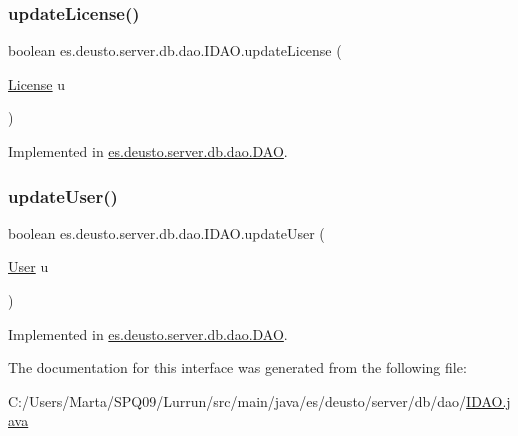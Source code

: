 \subsubsection{\texorpdfstring{update\+License()}{updateLicense()}}
{\footnotesize\ttfamily boolean es.\+deusto.\+server.\+db.\+dao.\+I\+D\+A\+O.\+update\+License (\begin{DoxyParamCaption}\item[{\hyperlink{classes_1_1deusto_1_1server_1_1db_1_1data_1_1_license}{License}}]{u }\end{DoxyParamCaption})}



Implemented in \hyperlink{classes_1_1deusto_1_1server_1_1db_1_1dao_1_1_d_a_o_a98774e8d93cdd4d8d104a197bd37d4e1}{es.\+deusto.\+server.\+db.\+dao.\+D\+AO}.

\mbox{\label{interfacees_1_1deusto_1_1server_1_1db_1_1dao_1_1_i_d_a_o_a790b00e2989b634c1bbb2c6620ff3583}} 
\subsubsection{\texorpdfstring{update\+User()}{updateUser()}}
{\footnotesize\ttfamily boolean es.\+deusto.\+server.\+db.\+dao.\+I\+D\+A\+O.\+update\+User (\begin{DoxyParamCaption}\item[{\hyperlink{classes_1_1deusto_1_1server_1_1db_1_1data_1_1_user}{User}}]{u }\end{DoxyParamCaption})}



Implemented in \hyperlink{classes_1_1deusto_1_1server_1_1db_1_1dao_1_1_d_a_o_a7f6ed77294fe1f61cbebbea410cef6e0}{es.\+deusto.\+server.\+db.\+dao.\+D\+AO}.



The documentation for this interface was generated from the following file\+:\begin{DoxyCompactItemize}
\item 
C\+:/\+Users/\+Marta/\+S\+P\+Q09/\+Lurrun/src/main/java/es/deusto/server/db/dao/\hyperlink{_i_d_a_o_8java}{I\+D\+A\+O.\+java}\end{DoxyCompactItemize}
